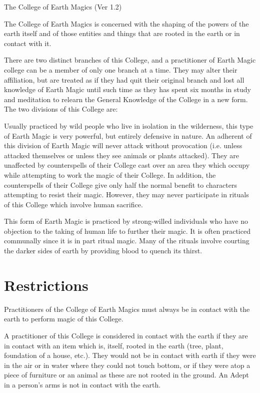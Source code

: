 \begin{Chapter}{The College of Earth Magics (Ver 1.2)}

The College of Earth Magics is concerned with the shaping of the
powers of the earth itself and of those entities and things that are
rooted in the earth or in contact with it.

There are two distinct branches of this College, and a practitioner of
Earth Magic college can be a member of only one branch at a time.
They may alter their affiliation, but are treated as if they had quit
their original branch and lost all knowledge of Earth Magic until such
time as they has spent six months in study and meditation to relearn
the General Knowledge of the College in a new form. The two divisions
of this College are:
\begin{Description}
\item[Pacifistic Earth Magic] Usually practiced by wild people who
  live in isolation in the wilderness, this type of Earth Magic is
  very powerful, but entirely defensive in nature. An adherent of this
  division of Earth Magic will never attack without provocation (i.e.
  unless attacked themselves or unless they see animals or plants
  attacked). They are unaffected by counterspells of their College
  cast over an area they which occupy while attempting to work the
  magic of their College.  In addition, the counterspells of their
  College give only half the normal benefit to characters attempting
  to resist their magic.  However, they may never participate in
  rituals of this College which involve human sacrifice.

\item[Druidic Earth Magic] This form of Earth Magic is practiced by
  strong-willed individuals who have no objection to the taking of
  human life to further their magic.  It is often practiced communally
  since it is in part ritual magic.  Many of the rituals involve
  courting the darker sides of earth by providing blood to quench its
  thirst.
\end{Description}

\section{Restrictions}

Practitioners of the College of Earth Magics must always be in contact
with the earth to perform magic of this College.

A practitioner of this College is considered in contact with the earth
if they are in contact with an item which is, itself, rooted in the
earth (tree, plant, foundation of a house, etc.). They would not be in
contact with earth if they were in the air or in water where they
could not touch bottom, or if they were atop a piece of furniture or
an animal as these are not rooted in the ground.  An Adept in a
person’s arms is not in contact with the earth.


\end{Chapter}
